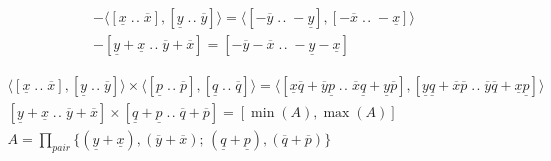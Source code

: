 \documentclass[11pt]{amsart}
\DeclareMathOperator{\till}{.\!.}
\begin{document}
\begin{align}
- \langle [\underline{x}\till\overline{x}],[\underline{y}\till\overline{y}] \rangle =
\langle [-\overline{y}\till-\underline{y}], [-\overline{x}\till-\underline{x}] \rangle
\\
-[\underline{y}+\underline{x}\till \overline{y}+\overline{x}] = 
[-\overline{y}-\overline{x} \till -\underline{y}-\underline{x}] 
\end{align}


\begin{align}
\langle [\underline{x}\till\overline{x}],[\underline{y}\till\overline{y}] \rangle \times 
\langle [\underline{p}\till\overline{p}],[\underline{q}\till\overline{q}] \rangle =
\langle [\underline{x}\overline{q} + \overline{y}\underline{p} \till\overline{x}\underline{q} + \underline{y}\overline{p}],
[\underline{y}\underline{q}+\overline{x}\overline{p}\till\overline{y}\overline{q}+\underline{x}\underline{p}] \rangle
\\
[\underline{y}+\underline{x}\till \overline{y}+\overline{x}] \times 
[\underline{q}+\underline{p}\till\overline{q}+\overline{p}] =
[\min(A), \max(A)]
\\
A = \prod_{pair}  \{ (\underline{y}+\underline{x}),(\overline{y}+\overline{x});\,
(\underline{q}+\underline{p}),(\overline{q}+\overline{p}) \}
\end{align}
\end{document}
